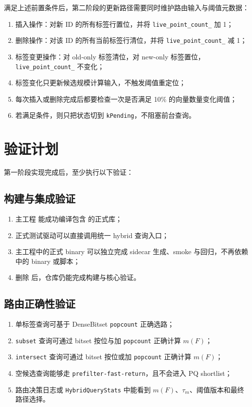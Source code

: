 \documentclass[UTF8]{ctexart}
\begin{document}
满足上述前置条件后，第二阶段的更新路径需要同时维护路由输入与阈值元数据：

\begin{enumerate}
\item 插入操作：对新 ID 的所有标签行置位，并将 \texttt{live\_point\_count\_} 加 1；
\item 删除操作：对该 ID 的所有当前标签行清位，并将 \texttt{live\_point\_count\_} 减 1；
\item 标签变更操作：对 old-only 标签清位，对 new-only 标签置位，\texttt{live\_point\_count\_} 不变化；
\item 标签变化只更新候选规模计算输入，不触发阈值重定位；
\item 每次插入或删除完成后都要检查一次是否满足 10\% 的向量数量变化阈值；
\item 若满足条件，则只把状态切到 \texttt{kPending}，不阻塞前台查询。
\end{enumerate}

\section{验证计划}
第一阶段实现完成后，至少执行以下验证：

\subsection{构建与集成验证}
\begin{enumerate}
\item 主工程  能成功编译包含  的正式库；
\item 正式测试驱动可以直接调用统一 hybrid 查询入口；
\item 主工程中的正式 binary 可以独立完成 sidecar 生成、smoke 与回归，不再依赖  中的 binary 或脚本；
\item 删除  后，仓库仍能完成构建与核心验证。
\end{enumerate}

\subsection{路由正确性验证}
\begin{enumerate}
\item 单标签查询可基于 DenseBitset \texttt{popcount} 正确选路；
\item \texttt{subset} 查询可通过 bitset 按位与加 \texttt{popcount} 正确计算 \(m(F)\)；
\item \texttt{intersect} 查询可通过 bitset 按位或加 \texttt{popcount} 正确计算 \(m(F)\)；
\item 空候选查询能够走 \texttt{prefilter-fast-return}，且不会进入 PQ shortlist；
\item 路由决策日志或 \texttt{HybridQueryStats} 中能看到 \(m(F)\)、\(\tau_m\)、阈值版本和最终路径选择。
\end{enumerate}
\end{document}

